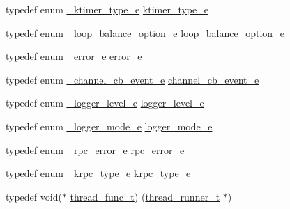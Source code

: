 \begin{DoxyCompactItemize}
\item 
typedef enum \hyperlink{a00051_a7945681f6589a5f4f6cf55f4f4092d28_a7945681f6589a5f4f6cf55f4f4092d28}{\+\_\+ktimer\+\_\+type\+\_\+e} \hyperlink{a00051_a42e924130e6eb3bd995344f6d3f3e918_a42e924130e6eb3bd995344f6d3f3e918}{ktimer\+\_\+type\+\_\+e}
\item 
typedef enum \hyperlink{a00051_a0f82b35b603ffed92ea1a74205f10781_a0f82b35b603ffed92ea1a74205f10781}{\+\_\+loop\+\_\+balance\+\_\+option\+\_\+e} \hyperlink{a00051_a6c87150c8f33855c3427c783480fd8ba_a6c87150c8f33855c3427c783480fd8ba}{loop\+\_\+balance\+\_\+option\+\_\+e}
\item 
typedef enum \hyperlink{a00051_ad8bc998d415be9115a064a8307df0ed5_ad8bc998d415be9115a064a8307df0ed5}{\+\_\+error\+\_\+e} \hyperlink{a00051_a884b5eeef8214526df297659611c7d9b_a884b5eeef8214526df297659611c7d9b}{error\+\_\+e}
\item 
typedef enum \hyperlink{a00051_a2217ac7363dbae279d056a361d122915_a2217ac7363dbae279d056a361d122915}{\+\_\+channel\+\_\+cb\+\_\+event\+\_\+e} \hyperlink{a00051_aaf2cba5d4035f3d56350b59342ebf65c_aaf2cba5d4035f3d56350b59342ebf65c}{channel\+\_\+cb\+\_\+event\+\_\+e}
\item 
typedef enum \hyperlink{a00051_a4e764c733cf98ee587ca17412fca9148_a4e764c733cf98ee587ca17412fca9148}{\+\_\+logger\+\_\+level\+\_\+e} \hyperlink{a00051_afe883c56a5fd8d7794a3dd36780ed9d0_afe883c56a5fd8d7794a3dd36780ed9d0}{logger\+\_\+level\+\_\+e}
\item 
typedef enum \hyperlink{a00051_a95d677e6aef6e1699b92848e4497c23a_a95d677e6aef6e1699b92848e4497c23a}{\+\_\+logger\+\_\+mode\+\_\+e} \hyperlink{a00051_aa72cd8c306f50bee7c64e1daa1c1f3f4_aa72cd8c306f50bee7c64e1daa1c1f3f4}{logger\+\_\+mode\+\_\+e}
\item 
typedef enum \hyperlink{a00051_a5a9afdfc8281994f0692b49499d731bf_a5a9afdfc8281994f0692b49499d731bf}{\+\_\+rpc\+\_\+error\+\_\+e} \hyperlink{a00051_aba1e847dfcabe31256c7f60abe0272a6_aba1e847dfcabe31256c7f60abe0272a6}{rpc\+\_\+error\+\_\+e}
\item 
typedef enum \hyperlink{a00051_aa250e66ac76155c15e3e1d24d0431931_aa250e66ac76155c15e3e1d24d0431931}{\+\_\+krpc\+\_\+type\+\_\+e} \hyperlink{a00051_a6bca3ecacad337637254bb43ab58a0b6_a6bca3ecacad337637254bb43ab58a0b6}{krpc\+\_\+type\+\_\+e}
\item 
typedef void($\ast$ \hyperlink{a00051_a46bcd8005e5d86fdbc6be5af0a77156c_a46bcd8005e5d86fdbc6be5af0a77156c}{thread\+\_\+func\+\_\+t}) (\hyperlink{a00051_a9054159cde2f926ef61c28ce1e555199_a9054159cde2f926ef61c28ce1e555199}{thread\+\_\+runner\+\_\+t} $\ast$)

\end{DoxyCompactItemize}
